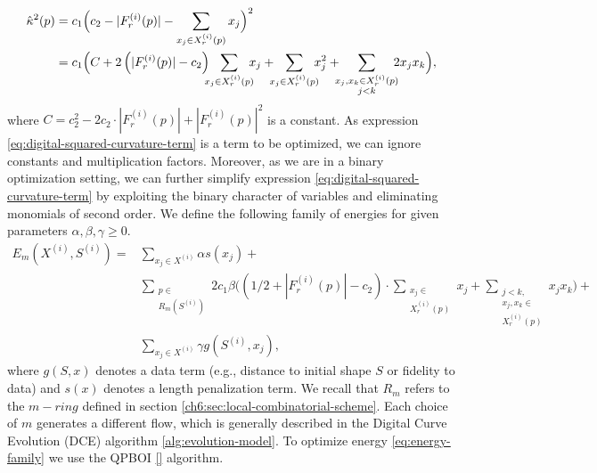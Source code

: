 \begin{align}
  \hat{\kappa}^2(p) &= c_1\Big( c_2 - |F_{r}^{(i)}(p)| - \sum_{x_j \in X_r^{(i)}(p)} {x_j} \Big)^2 \nonumber \\
   &= c_1 \Big( C + 2\left( |F_{r}^{(i)}(p)| - c_2 \right) \hspace{-2mm}\sum_{x_j \in X_{r}^{(i)}(p)}\hspace{-2mm}{x_j} + \hspace{-2mm}\sum_{x_j \in X_{r}^{(i)}(p)}\hspace{-2mm}{x_j^2} + \hspace{-2mm}\sum_{ \substack{x_j,x_k \in X_{r}^{(i)}(p) \\ j<k} }\hspace{-2mm}{2x_jx_k}  \Big),
   \label{eq:digital-squared-curvature-term}
\end{align}
where $C=c_2^2 - 2c_2 \cdot |F_{r}^{(i)}(p)| + |F_{r}^{(i)}(p)|^2$ is a constant. As expression \eqref{eq:digital-squared-curvature-term} is a term to be optimized, we can ignore constants and multiplication factors. Moreover, as we are in a binary optimization setting, we can  further simplify expression \eqref{eq:digital-squared-curvature-term} by exploiting the binary character of variables and eliminating monomials of second order. We define the following family
of energies for given parameters $\alpha,\beta, \gamma \geq 0$.
\begin{align}
  E_m(X^{(i)},S^{(i)}) =& \sum_{x_j \in X^{(i)}}{\alpha s(x_j)} + \nonumber \\ 
  & \sum_{ \substack{p \in \\ R_m(S^{(i)})}}{ 2c_1 \beta  \Big( { (1/2+ |F_{r}^{(i)}(p)|-c_2) \cdot \sum_{ \substack{ x_j \in \\ X_{r}^{(i)}(p)}}{x_j} } + \sum_{ \substack{j<k, \\ x_j,x_k \in \\ X_{r}^{(i)}(p) } }{x_jx_k} \Big) } + \nonumber \\
  & \sum_{x_j \in X^{(i)}}{\gamma g(S^{(i)},x_j)},
  \label{eq:energy-family}
\end{align}
where $g(S,x)$ denotes a data term (e.g., distance to initial shape $S$ or fidelity to data) and $s(x)$ denotes a length penalization term. We recall that $R_m$ refers to the $m-ring$ defined in section \ref{ch6:sec:local-combinatorial-scheme}. Each choice of $m$ generates a different flow, which is generally described in the Digital Curve Evolution (DCE) algorithm \ref{alg:evolution-model}. To optimize energy \eqref{eq:energy-family} we use the QPBOI \ref{} algorithm.


